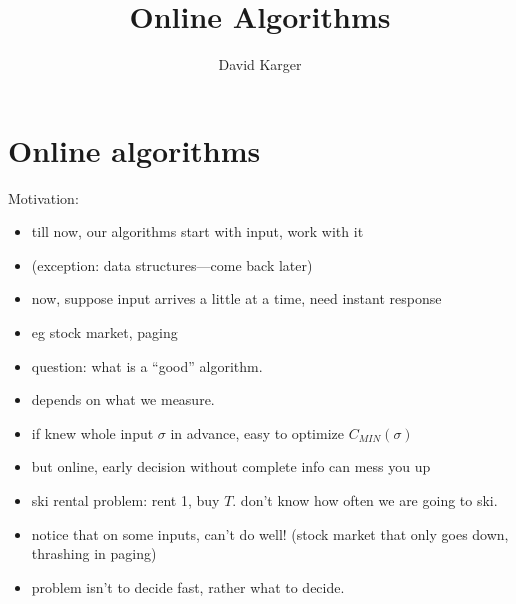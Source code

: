 \documentclass{article}
\title{Online Algorithms}
\author{David Karger}
\begin{document}
\def\OPT{\mbox{OPT}}

\section{Online algorithms}

Motivation:
\begin{itemize}
\item till now, our algorithms start with input, work with it
\item (exception: data structures---come back later)
\item now, suppose input arrives a little at a time, need instant
  response
\item eg stock market, paging
\item question: what is a ``good'' algorithm.
\item depends on what we measure.
\item if knew whole input $\sigma $ in advance, easy to optimize
  $C_{MIN}(\sigma)$
\item but online, early decision without complete info can mess you up 
\item ski rental problem: rent 1, buy $T$.  don't know how often we are going to ski.
\item notice that on some inputs, can't do well! (stock market that
  only goes down, thrashing in paging)
\item problem isn't to decide fast, rather what to decide.
\end{itemize}
\end{document}
